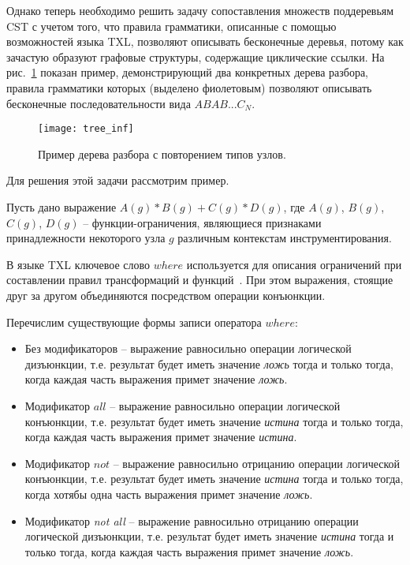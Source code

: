 Однако теперь необходимо решить задачу сопоставления множеств поддеревьям CST с учетом того, что правила грамматики, описанные с помощью возможностей языка TXL, позволяют описывать бесконечные деревья, потому как зачастую образуют графовые структуры, содержащие циклические ссылки.
На рис.~\ref{fig:tree-inf} показан пример, демонстрирующий два конкретных дерева разбора, правила грамматики которых (выделено фиолетовым) позволяют описывать бесконечные последовательности вида $ABAB ... {C_N}$.

\begin{figure}[!h]
	\centering
	\texttt{[image: tree\_inf]}
	\caption{Пример дерева разбора с повторением типов узлов.}
	\label{fig:tree-inf}
\end{figure}

Для решения этой задачи рассмотрим пример.

Пусть дано выражение $A(g) * B(g) + C(g) * D(g)$, где $A(g)$, $B(g)$, $C(g)$, $D(g)$ -- функции-ограничения, являющиеся признаками принадлежности некоторого узла $g$ различным контекстам инструментирования.

В языке TXL ключевое слово $where$ используется для описания ограничений при составлении правил трансформаций и функций~\cite{txl-book}.
При этом выражения, стоящие друг за другом объединяются посредством операции конъюнкции.

Перечислим существующие формы записи оператора $where$:
\begin{itemize}[noitemsep]
  \item Без модификаторов -- выражение равносильно операции логической дизъюнкции, т.е. результат будет иметь значение \textit{ложь} тогда и только тогда, когда каждая часть выражения примет значение \textit{ложь}.
  \item Модификатор $all$ -- выражение равносильно операции логической конъюнкции, т.е. результат будет иметь значение \textit{истина} тогда и только тогда, когда каждая часть выражения примет значение \textit{истина}.
  \item Модификатор $not$ -- выражение равносильно отрицанию операции логической конъюнкции, т.е. результат будет иметь значение \textit{истина} тогда и только тогда, когда хотябы одна часть выражения примет значение \textit{ложь}.
  \item Модификатор \textit{not all} -- выражение равносильно отрицанию операции логической дизъюнкции, т.е. результат будет иметь значение \textit{истина} тогда и только тогда, когда каждая часть выражения примет значение \textit{ложь}.
\end{itemize}

